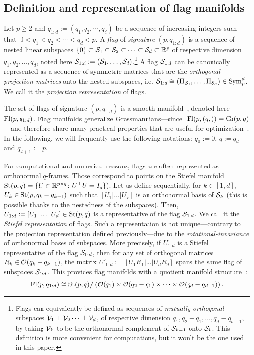 \subsection{Definition and representation of flag manifolds}
Let $p \geq 2$ %
and $q_{1:d} := (q_1, q_2 ,\cdots, q_d)$ be a sequence of increasing integers such that $~{0 < q_1 < q_2 < \cdots < q_d < p}$.
A \textit{flag} of \textit{signature} $(p, q_{1:d})$ is a sequence of nested {linear} subspaces $\{0\} \subset \S_1 \subset \S_2 \subset \dots \subset \S_d \subset \R^p$ of respective dimension $q_1, q_2, \dots, q_d$, noted here $\S_{1:d} := (\S_1, \dots, \S_d)$.\footnote{Flags can equivalently be defined as sequences of \textit{mutually orthogonal} subspaces $\V_1 \perp \V_2 \dots \perp \V_d$, of respective dimension $q_1, q_2-q_1, \dots, q_d - q_{d-1}$, by taking $\V_k$ to be the orthonormal complement of $\S_{k-1}$ onto $\S_k$. This definition is more convenient for computations, but it won't be the one used in this paper.}
A flag $\S_{1:d}$ can be canonically represented as a sequence of symmetric matrices that are the \textit{orthogonal projection matrices} onto the nested subspaces, i.e. $\S_{1:d} \cong (\Pi_{\S_1}, \dots, \Pi_{\S_d})\in\Sym_p^d$. We call it the \textit{projection representation} of flags.

The set of flags of signature $(p, q_{1:d})$ is a smooth manifold~\citep{ye_optimization_2022}, denoted here $\Fl(p, q_{1:d})$. 
Flag manifolds generalize {Grassmannians}---since $~{\Fl(p, (q,)) = \Gr(p, q)}$---and therefore share many practical properties that are useful for optimization~\citep{edelman_geometry_1998}. In the following, we will frequently use the following notations: $q_0 := 0$, $q := q_d$ and $q_{d+1} := p$.


For computational and numerical reasons, flags are often represented as orthonormal $q$-frames. Those correspond to points on the Stiefel manifold $\St(p, q) = \{U\in\R^{p\times q}\colon U\T U = I_q\}$).
Let us define sequentially, for $k\in[1, d]$, $U_k\in\St(p, q_k - q_{k-1})$ such that $[U_1|\dots|U_k]$ is an orthonormal basis of $\S_k$ (this is possible thanks to the nestedness of the subspaces).
Then, $U_{1:d} := [U_1|\dots|U_d]\in\St(p, q)$ is a representative of the flag $\S_{1:d}$. We call it the \textit{Stiefel representation} of flags. Such a representation is not unique---contrary to the projection representation defined previously---due to the \textit{rotational-invariance} of orthonormal bases of subspaces. More precisely, if $U_{1:d}$ is a Stiefel representative of the flag $\S_{1:d}$, then for any set of orthogonal matrices $R_k\in\O(q_k - q_{k-1})$, the matrix $U'_{1:d} := [U_1 R_1|\dots|U_d R_d]$ spans the same flag of subspaces $\S_{1:d}$.
This provides flag manifolds with a quotient manifold structure~\citep{edelman_geometry_1998, absil_optimization_2009, ye_optimization_2022}: 
\begin{equation}\label{eq:Fl_quotient}
	\Fl(p, q_{1:d}) \cong \St(p, q) \big/ \lrp{\O(q_1) \times \O(q_2 - q_1) \times \dots \times \O(q_d - q_{d-1})}.
\end{equation}

